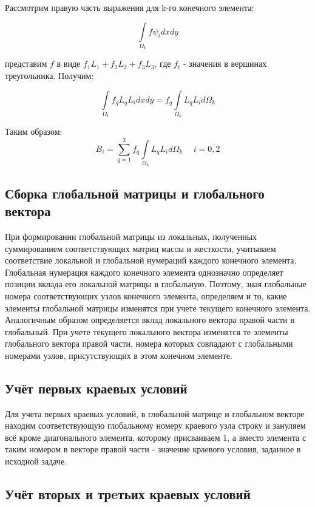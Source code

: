 \documentclass[12pt,a4paper]{article}
\begin{document}
Рассмотрим правую часть выражения для k-го конечного элемента:

$$
\int \limits_{\Omega_k} f \psi_i dxdy
$$

\noindent представим $f$ в виде $f_1 L_1 + f_2 L_2 + f_3 L_3$, где
$f_i$ - значения в вершинах треугольника. Получим:

$$
\int \limits_{\Omega_k} f_q L_q L_i dxdy =
    f_q \int \limits_{\Omega_k} L_q L_i d \Omega_k
$$

\noindent Таким образом:
$$
B_i = \sum \limits_{q=1}^{3}
    f_q \int \limits_{\Omega_k} L_q L_i d\Omega_k
    \hspace{15pt} i=\overline{0,2}
$$

\subsection*{Сборка глобальной матрицы и глобального вектора}

При формировании глобальной матрицы из локальных,
полученных суммированием соответствующих матриц
массы и жесткости, учитываем соответствие локальной
и глобальной нумераций каждого конечного элемента.
Глобальная нумерация каждого конечного элемента
однозначно определяет позиции вклада его локальной
матрицы в глобальную. Поэтому, зная глобальные
номера соответствующих узлов конечного элемента,
определяем и то, какие элементы глобальной матрицы
изменятся при учете текущего конечного элемента.
Аналогичным образом определяется вклад локального
вектора правой части в глобальный. При учете
текущего локального вектора изменятся те элементы
глобального вектора правой части, номера которых
совпадают с глобальными номерами узлов, присутствующих
в этом конечном элементе.

\subsection*{Учёт первых краевых условий}

Для учета первых краевых условий, в глобальной матрице
и глобальном векторе находим соответствующую глобальному
номеру краевого узла строку и зануляем всё кроме
диагонального элемента, которому присваиваем 1, а вместо
элемента с таким номером в векторе правой части - значение
краевого условия, заданное в исходной задаче.


\subsection*{Учёт вторых и трeтьих краевых условий}
\end{document}
